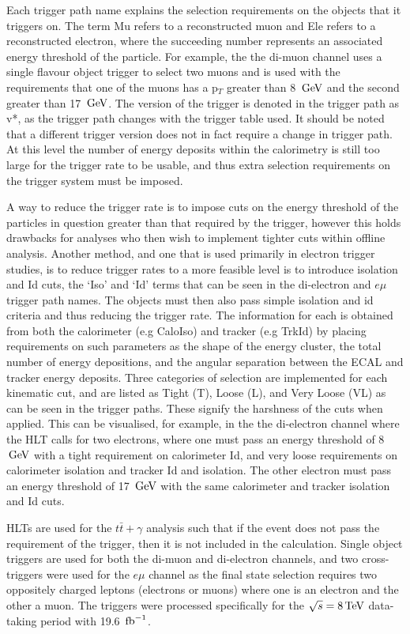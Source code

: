 Each trigger path name explains the selection requirements on the objects that it triggers on. The term Mu refers to a reconstructed muon and Ele refers to a reconstructed electron, where the succeeding number represents an associated energy threshold of the particle. For example, the the di-muon channel uses a single flavour object trigger to select two muons and is used with the requirements that one of the muons has a p$_T$ greater than 8 $\,\text{Ge\hspace{-.08em}V}$ and the second greater than 17 $\,\text{Ge\hspace{-.08em}V}$. The version of the trigger is denoted in the trigger path as v*, as the trigger path changes with the trigger table used. It should be noted that a different trigger version does not in fact require a change in trigger path. At this level the number of energy deposits within the calorimetry is still too large for the trigger rate to be usable, and thus extra selection requirements on the trigger system must be imposed.

A way to reduce the trigger rate is to impose cuts on the energy threshold of the particles in question greater than that required by the trigger, however this holds drawbacks for analyses who then wish to implement tighter cuts within offline analysis. Another method, and one that is used primarily in electron trigger studies, is to reduce trigger rates to a more feasible level is to introduce isolation and Id cuts, the `Iso' and `Id' terms that can be seen in the di-electron and $e\mu$ trigger path names. The objects must then also pass simple isolation and id criteria and thus reducing the trigger rate. The information for each is obtained from both the calorimeter (e.g CaloIso) and tracker (e.g TrkId) by placing requirements on such parameters as the shape of the energy cluster, the total number of energy depositions, and the angular separation between the ECAL and tracker energy deposits. Three categories of selection are implemented for each kinematic cut, and are listed as Tight (T), Loose (L), and Very Loose (VL) as can be seen in the trigger paths. These signify the harshness of the cuts when applied. This can be visualised, for example, in the the di-electron channel where the HLT calls for two electrons, where one must pass an energy threshold of 8 $\,\text{Ge\hspace{-.08em}V}$ with a tight requirement on calorimeter Id, and very loose requirements on calorimeter isolation and tracker Id and isolation. The other electron must pass an energy threshold of 17 $\,\text{Ge\hspace{-.08em}V}$ with the same calorimeter and tracker isolation and Id cuts.

HLTs are used for the $t\bar{t}+\gamma$ analysis such that if the event does not pass the requirement of the trigger, then it is not included in the calculation. Single object triggers are used for both the di-muon and di-electron channels, and two cross-triggers were used for the $e\mu$ channel as the final state selection requires two oppositely charged leptons (electrons or muons) where one is an electron and the other a muon. The triggers were processed specifically for the $\sqrt{s}=8 \,\text{Te\hspace{-.08em}V}$ data-taking period with 19.6 $\mbox{\ensuremath{\,\text{fb}^\text{$-$1}}}$.

